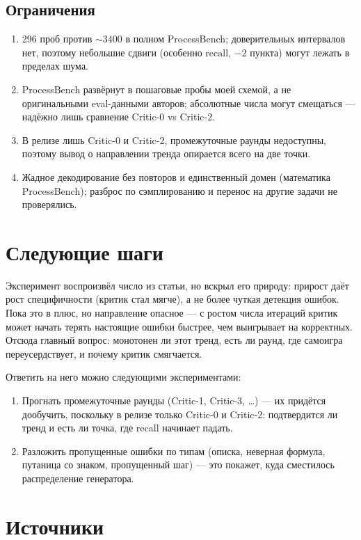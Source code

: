 \documentclass[11pt,a4paper]{article}
\begin{document}
\subsection*{Ограничения}

\begin{enumerate}
  \item 296 проб против ${\sim}3400$ в полном ProcessBench; доверительных интервалов нет, поэтому небольшие сдвиги (особенно recall, $-2$ пункта) могут лежать в пределах шума.
  \item ProcessBench развёрнут в пошаговые пробы моей схемой, а не оригинальными eval-данными авторов; абсолютные числа могут смещаться — надёжно лишь сравнение Critic-0 vs Critic-2.
  \item В релизе лишь Critic-0 и Critic-2, промежуточные раунды недоступны, поэтому вывод о направлении тренда опирается всего на две точки.
  \item Жадное декодирование без повторов и единственный домен (математика ProcessBench); разброс по сэмплированию и перенос на другие задачи не проверялись.
\end{enumerate}

\section*{Следующие шаги}

Эксперимент воспроизвёл число из статьи, но вскрыл его природу: прирост даёт рост специфичности (критик стал мягче), а не более чуткая детекция ошибок. Пока это в плюс, но направление опасное — с ростом числа итераций критик может начать терять настоящие ошибки быстрее, чем выигрывает на корректных. Отсюда главный вопрос: монотонен ли этот тренд, есть ли раунд, где самоигра переусердствует, и почему критик смягчается.

Ответить на него можно следующими экспериментами:

\begin{enumerate}
  \item Прогнать промежуточные раунды (Critic-1, Critic-3, \dots) — их придётся дообучить, поскольку в релизе только Critic-0 и Critic-2: подтвердится ли тренд и есть ли точка, где recall начинает падать.
  \item Разложить пропущенные ошибки по типам (описка, неверная формула, путаница со знаком, пропущенный шаг) — это покажет, куда сместилось распределение генератора.
\end{enumerate}

\section*{Источники}
\end{document}

